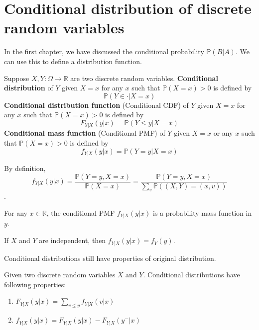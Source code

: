 \documentclass{huhtakm-template-book}
\newcommand{\prob}{\mathbb{P}}
\begin{document}
\section{Conditional distribution of discrete random variables}
In the first chapter, we have discussed the conditional probability $\prob(B|A)$. We can use this to define a distribution function.
\begin{defn}
	Suppose $X,Y:\Omega\to\mathbb{R}$ are two discrete random variables. \textbf{Conditional distribution} of $Y$ given $X=x$ for any $x$ such that $\prob(X=x)>0$ is defined by
	\begin{equation*}
		\prob(Y\in \cdot|X=x)
	\end{equation*}
	\textbf{Conditional distribution function} (Conditional CDF) of $Y$ given $X=x$ for any $x$ such that $\prob(X=x)>0$ is defined by
	\begin{equation*}
		F_{Y|X}(y|x)=\prob(Y\leq y|X=x)
	\end{equation*}
	\textbf{Conditional mass function} (Conditional PMF) of $Y$ given $X=x$ or any $x$ such that $\prob(X=x)>0$ is defined by
	\begin{equation*}
		f_{Y|X}(y|x)=\prob(Y=y|X=x)
	\end{equation*}
\end{defn}
\begin{rem}
	By definition, 
	\begin{equation*}
		f_{Y|X}(y|x)=\frac{\prob(Y=y,X=x)}{\prob(X=x)}=\frac{\prob(Y=y,X=x)}{\sum_{v}\prob((X,Y)=(x,v))}
	\end{equation*}.
\end{rem}
\begin{rem}
	For any $x\in\mathbb{R}$, the conditional PMF $f_{Y|X}(y|x)$ is a probability mass function in $y$.
\end{rem}
\begin{rem}
	If $X$ and $Y$ are independent, then $f_{Y|X}(y|x)=f_{Y}(y)$.
\end{rem}
Conditional distributions still have properties of original distribution.
\begin{lem}
	Given two discrete random variables $X$ and $Y$. Conditional distributions have following properties:
	\begin{enumerate}
		\item $F_{Y|X}(y|x)=\sum_{v\leq y}f_{Y|X}(v|x)$
		\item $f_{Y|X}(y|x)=F_{Y|X}(y|x)-F_{Y|X}(y^{-}|x)$
	\end{enumerate}
\end{lem}
\end{document}
